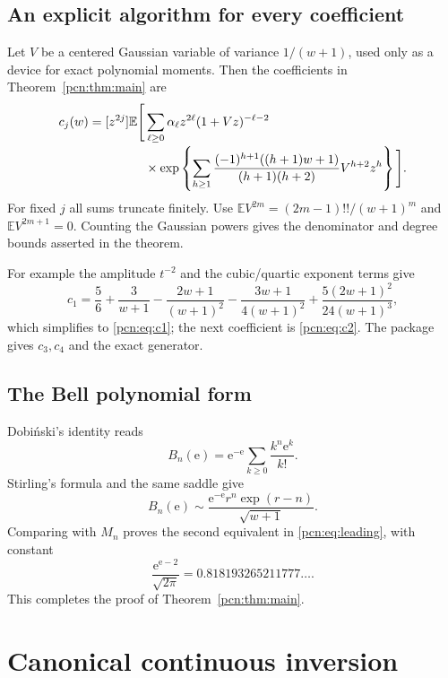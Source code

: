 \documentclass[11pt,letterpaper]{article}
\theoremstyle{remark}\newtheorem{remark}[theorem]{Remark}
\newcommand{\E}{\mathbb E}
\newcommand{\ee}{\mathrm e}
\begin{document}
\subsection{An explicit algorithm for every coefficient}
Let $V$ be a centered Gaussian variable of variance $1/(w+1)$, used only as a device for exact polynomial moments. Then the coefficients in Theorem~\ref{pcn:thm:main} are
\begin{align}\label{pcn:eq:c-algorithm}
 c_j(w)=[z^{2j}]\E\Bigg[&\sum_{\ell\ge0}\alpha_\ell z^{2\ell}
                                      (1+Vz)^{-\ell-2}\notag\\[-2pt]
 &\times\exp\left\{\sum_{h\ge1}
 \frac{(-1)^{h+1}((h+1)w+1)}{(h+1)(h+2)}V^{h+2}z^h\right\}\Bigg].
\end{align}
For fixed $j$ all sums truncate finitely. Use $\E V^{2m}=(2m-1)!!/(w+1)^m$ and $\E V^{2m+1}=0$. Counting the Gaussian powers gives the denominator and degree bounds asserted in the theorem.

For example the amplitude $t^{-2}$ and the cubic/quartic exponent terms give
\[
 c_1=\frac56+\frac3{w+1}-\frac{2w+1}{(w+1)^2}
 -\frac{3w+1}{4(w+1)^2}+\frac{5(2w+1)^2}{24(w+1)^3},
\]
which simplifies to \eqref{pcn:eq:c1}; the next coefficient is \eqref{pcn:eq:c2}. The package gives $c_3,c_4$ and the exact generator.

\subsection{The Bell polynomial form}
Dobi\'nski's identity reads
\[
 B_n(\ee)=\ee^{-\ee}\sum_{k\ge0}\frac{k^n\ee^k}{k!}.
\]
Stirling's formula and the same saddle give
\[
 B_n(\ee)\sim\frac{\ee^{-\ee}r^n\exp(r-n)}{\sqrt{w+1}}.
\]
Comparing with $M_n$ proves the second equivalent in \eqref{pcn:eq:leading}, with constant
\[
 \frac{\ee^{\ee-2}}{\sqrt{2\pi}}=0.818193265211777\ldots.
\]
This completes the proof of Theorem~\ref{pcn:thm:main}.

\section{Canonical continuous inversion}\label{pcn:sec:inverse}
\end{document}
